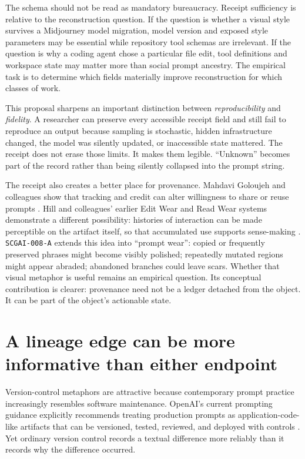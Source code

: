 \documentclass[11pt]{article}
\newcommand{\zettel}[1]{\texttt{#1}}
\begin{document}
The schema should not be read as mandatory bureaucracy. Receipt sufficiency is relative to the reconstruction question. If the question is whether a visual style survives a Midjourney model migration, model version and exposed style parameters may be essential while repository tool schemas are irrelevant. If the question is why a coding agent chose a particular file edit, tool definitions and workspace state may matter more than social prompt ancestry. The empirical task is to determine which fields materially improve reconstruction for which classes of work.

This proposal sharpens an important distinction between \emph{reproducibility} and \emph{fidelity}. A researcher can preserve every accessible receipt field and still fail to reproduce an output because sampling is stochastic, hidden infrastructure changed, the model was silently updated, or inaccessible state mattered. The receipt does not erase those limits. It makes them legible. ``Unknown'' becomes part of the record rather than being silently collapsed into the prompt string.

The receipt also creates a better place for provenance. Mahdavi Goloujeh and colleagues show that tracking and credit can alter willingness to share or reuse prompts \cite{mahdavigoloujeh2024social}. Hill and colleagues' earlier Edit Wear and Read Wear systems demonstrate a different possibility: histories of interaction can be made perceptible on the artifact itself, so that accumulated use supports sense-making \cite{hill1992editwear}. \zettel{SCGAI-008-A} extends this idea into ``prompt wear'': copied or frequently preserved phrases might become visibly polished; repeatedly mutated regions might appear abraded; abandoned branches could leave scars. Whether that visual metaphor is useful remains an empirical question. Its conceptual contribution is clearer: provenance need not be a ledger detached from the object. It can be part of the object's actionable state.

\section{A lineage edge can be more informative than either endpoint}

Version-control metaphors are attractive because contemporary prompt practice increasingly resembles software maintenance. OpenAI's current prompting guidance explicitly recommends treating production prompts as application-code-like artifacts that can be versioned, tested, reviewed, and deployed with controls \cite{openai_prompting}. Yet ordinary version control records a textual difference more reliably than it records why the difference occurred.
\end{document}
